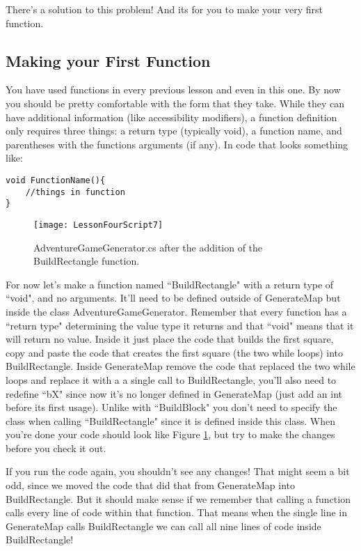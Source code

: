 \documentclass{article}
\begin{document}
There's a solution to this problem! And its for you to make your very first function. 

\subsection{Making your First Function}

You have used functions in every previous lesson and even in this one. By now you should be pretty comfortable with the form that they take. While they can have additional information (like accessibility modifiers), a function definition only requires three things: a return type (typically void), a function name, and parentheses with the functions arguments (if any). In code that looks something like:

\lstset{style=sharpc}
\begin{lstlisting}
void FunctionName(){
	//things in function
}
\end{lstlisting} 
\begin{figure}
  \texttt{[image: LessonFourScript7]}
  \caption{AdventureGameGenerator.cs after the addition of the BuildRectangle function.}
  \label{fig:LessonFourScript7}
\end{figure}

For now let's make a function named ``BuildRectangle" with a return type of ``void", and no arguments. It'll need to be defined outside of GenerateMap but inside the class AdventureGameGenerator. Remember that every function has a ``return type" determining the value type it returns and that ``void" means that it will return no value. Inside it just place the code that builds the first square, copy and paste the code that creates the first square (the two while loops) into BuildRectangle. Inside GenerateMap remove the code that replaced the two while loops and replace it with a a single call to BuildRectangle, you'll also need to redefine ``bX" since now it's no longer defined in GenerateMap (just add an int before its first usage). Unlike with ``BuildBlock" you don't need to specify the class when calling ``BuildRectangle" since it is defined inside this class. When you're done your code should look like Figure \ref{fig:LessonFourScript7}, but try to make the changes before you check it out.

\noindent{}

If you run the code again, you shouldn't see any changes! That might seem a bit odd, since we moved the code that did that from GenerateMap into BuildRectangle. But it should make sense if we remember that calling a function calls every line of code within that function. That means when the single line in GenerateMap calls BuildRectangle we can call all nine lines of code inside BuildRectangle!
\end{document}
